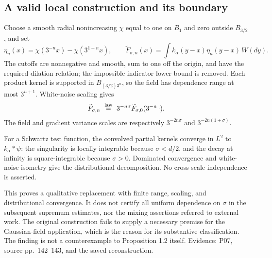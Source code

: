 \documentclass[10pt]{article}
\begin{document}
\subsection*{A valid local construction and its boundary}
Choose a smooth radial nonincreasing \(\chi\) equal to one on \(B_1\) and zero outside \(B_{3/2}\), and set \[\eta_n(x)=\chi(3^{-n}x)-\chi(3^{1-n}x),\qquad
 \widetilde F_{\sigma,n}(x)
 =\int k_\alpha(y-x)\eta_n(y-x)\,W(dy).\] The cutoffs are nonnegative and smooth, sum to one off the origin, and have the required dilation relation; the impossible indicator lower bound is removed. Each product kernel is supported in \(B_{(3/2)3^n}\), so the field has dependence range at most \(3^{n+1}\). White-noise scaling gives \[\widetilde F_{\sigma,n}\ \stackrel{\rm law}{=}\
 3^{-n\sigma}\widetilde F_{\sigma,0}(3^{-n}\,\cdot).\] The field and gradient variance scales are respectively \(3^{-2n\sigma}\) and \(3^{-2n(1+\sigma)}\).\par
For a Schwartz test function, the convolved partial kernels converge in \(L^2\) to \(k_\alpha*\psi\): the singularity is locally integrable because \(\sigma<d/2\), and the decay at infinity is square-integrable because \(\sigma>0\). Dominated convergence and white-noise isometry give the distributional decomposition. No cross-scale independence is asserted.\par
This proves a qualitative replacement with finite range, scaling, and distributional convergence. It does not certify all uniform dependence on \(\sigma\) in the subsequent supremum estimates, nor the mixing assertions referred to external work. The original construction fails to supply a necessary premise for the Gaussian-field application, which is the reason for its substantive classification. The finding is not a counterexample to Proposition 1.2 itself. Evidence: P07, source pp. 142–143, and the saved reconstruction.\par
\end{document}
